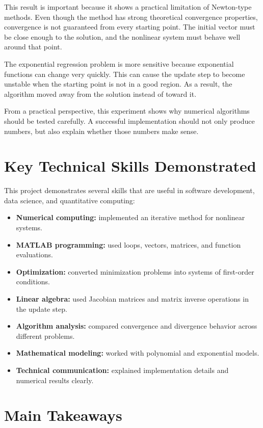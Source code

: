 \documentclass[11pt]{article}
\begin{document}
This result is important because it shows a practical limitation of Newton-type methods. Even though the method has strong theoretical convergence properties, convergence is not guaranteed from every starting point. The initial vector must be close enough to the solution, and the nonlinear system must behave well around that point.

The exponential regression problem is more sensitive because exponential functions can change very quickly. This can cause the update step to become unstable when the starting point is not in a good region. As a result, the algorithm moved away from the solution instead of toward it.

From a practical perspective, this experiment shows why numerical algorithms should be tested carefully. A successful implementation should not only produce numbers, but also explain whether those numbers make sense.

\section{Key Technical Skills Demonstrated}

This project demonstrates several skills that are useful in software development, data science, and quantitative computing:

\begin{itemize}[leftmargin=*]
    \item \textbf{Numerical computing:} implemented an iterative method for nonlinear systems.
    \item \textbf{MATLAB programming:} used loops, vectors, matrices, and function evaluations.
    \item \textbf{Optimization:} converted minimization problems into systems of first-order conditions.
    \item \textbf{Linear algebra:} used Jacobian matrices and matrix inverse operations in the update step.
    \item \textbf{Algorithm analysis:} compared convergence and divergence behavior across different problems.
    \item \textbf{Mathematical modeling:} worked with polynomial and exponential models.
    \item \textbf{Technical communication:} explained implementation details and numerical results clearly.
\end{itemize}

\section{Main Takeaways}
\end{document}
